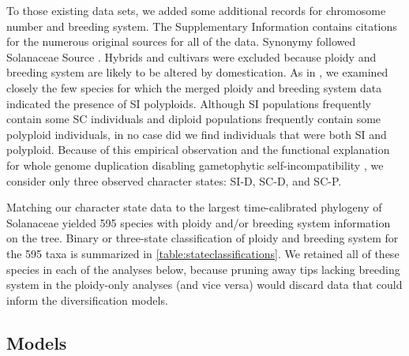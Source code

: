 To those existing data sets, we added some additional records for chromosome number and breeding system.
The Supplementary Information contains citations for the numerous original sources for all of the data. %
Synonymy followed Solanaceae Source \citep{solsource}.
Hybrids and cultivars were excluded because ploidy and breeding system are likely to be altered by domestication.
As in \citet{robertson_2011}, we examined closely the few species for which the merged ploidy and breeding system data indicated the presence of SI polyploids.
Although SI populations frequently contain some SC individuals and diploid populations frequently contain some polyploid individuals, in no case did we find individuals that were both SI and polyploid.
Because of this empirical observation and the functional explanation for whole genome duplication disabling gametophytic self-incompatibility \citep[reviewed in][]{ramsey_1998,stone_2002}, we consider only three observed character states: SI-D, SC-D, and SC-P.


Matching our character state data to the largest time-calibrated phylogeny of Solanaceae \citep{sarkinen_2013} yielded 595 species with ploidy and/or breeding system information on the tree.
Binary or three-state classification of ploidy and breeding system for the 595 taxa is summarized in \cref{table:stateclassifications}. %
We retained all of these species in each of the analyses below, because pruning away tips lacking breeding system in the ploidy-only analyses (and vice versa) would discard data that could inform the diversification models.

\subsection{Models}


